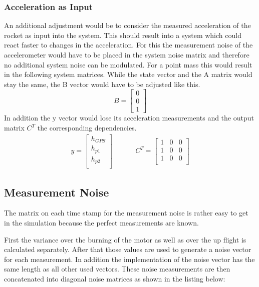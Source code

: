 \subsubsection{Acceleration as Input}
An additional adjustment would be to consider the measured acceleration of the rocket as input into the system.
This should result into a system which could react faster to changes in the acceleration.
For this the measurement noise of the accelerometer would have to be placed in the system noise matrix
and therefore no additional system noise can be modulated.
For a point mass this would result in the following system matrices.
While the state vector and the A matrix would stay the same, the B vector would have to be adjusted like this.
$$ B = \begin{bmatrix}
        0 \\
        0 \\
        1
       \end{bmatrix}
$$
In addition the y vector would lose its acceleration measurements and the output matrix $C^T$ the corresponding dependencies.
\begin{align*}
 y = \begin{bmatrix}
      h_{GPS} \\
      h_{p1} \\
      h_{p2} \\
     \end{bmatrix}
      & \hspace{1cm}
 C^T = \begin{bmatrix}
        1 & 0 & 0 \\
        1 & 0 & 0 \\
        1 & 0 & 0 \\
       \end{bmatrix}
\end{align*}

\subsection{Measurement Noise}
The matrix on each time stamp for the measurement noise is rather easy to get in the simulation because the perfect measurements are known.

First the variance over the burning of the motor as well as over the up flight is calculated separately.
After that those values are used to generate a noise vector for each measurement.
In addition the implementation of the noise vector has the same length as all other used vectors.
These noise measurements are then concatenated into diagonal noise matrices as shown in the listing below:


